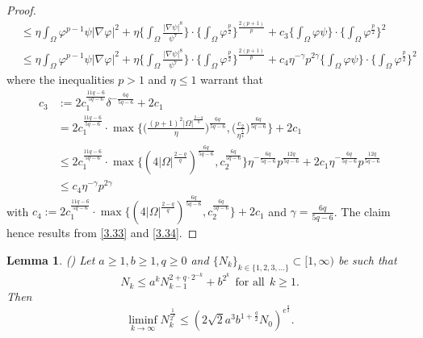 \documentclass[12pt]{article}
\theoremstyle{plain}
\newtheorem{lemma}{Lemma}[section]
\theoremstyle{definition}
\numberwithin{equation}{section}
\begin{document}
\begin{proof}
\begin{align}
            &\leq\eta\int_\Omega\varphi^{p-1}\psi|\nabla\varphi|^2
            +\eta\bigg\{\int_\Omega\frac{|\nabla\psi|^8}{\psi^7}\bigg\}
            \cdot\bigg\{\int_\Omega\varphi^{\frac{p}{2}}\bigg\}^{\frac{2(p+1)} {p}}%
            +c_3%
            \bigg\{\int_\Omega\varphi\psi\bigg\}
            \cdot\bigg\{\int_\Omega\varphi^{\frac{p}{2}}\bigg\}^{2}\nonumber\\
            &\leq\eta\int_\Omega\varphi^{p-1}\psi|\nabla\varphi|^2+\eta\bigg\{\int_\Omega\frac{|\nabla\psi|^8}{\psi^7}\bigg\}\cdot\bigg\{\int_\Omega\varphi^{\frac{p}{2}}\bigg\}^{\frac{2(p+1)} {p}}%
            +c_4\eta^{-\gamma}p^{2\gamma}\bigg\{\int_\Omega\varphi\psi\bigg\}\cdot\bigg\{\int_\Omega\varphi^{\frac{p}{2}}\bigg\}^{2}\nonumber
    \end{align}
    where the inequalities $p>1$ and $\eta\leq1$ warrant that
    \begin{align}\label{3.34}
            c_3&:=2c_1^{\frac{11q-6}{5q-6}}\delta^{-\frac{6q}{5q-6}}+2c_1\nonumber\\
            &=2c_1^{\frac{11q-6}{5q-6}}\cdot
            \max\bigg\{\bigg(\frac{(p+1)^2|\Omega|^{\frac{2-q}{q}}}{\eta}\bigg)^{\frac{6q}{5q-6}},
            \bigg(\frac{c_2}{\eta^{\frac{1}{4}}}\bigg)^{\frac{6q}{5q-6}}\bigg\}+2c_1\\
            &\leq 2c_1^{\frac{11q-6}{5q-6}}\cdot\max\bigg\{(4|\Omega|^{\frac{2-q}{q}})^{\frac{6q}{5q-6}},
            c_2^{\frac{6q}{5q-6}}\bigg\}
            \eta^{-\frac{6q}{5q-6}}p^{\frac{12q}{5q-6}}
            +2c_1\eta^{-\frac{6q}{5q-6}}p^{\frac{12q}{5q-6}}\nonumber\\
            & \leq c_4\eta^{-\gamma}p^{2\gamma}\nonumber
        \end{align}
    with $c_4:=2c_1^{\frac{11q-6}{5q-6}}\cdot\max\{(4|\Omega|^{\frac{2-q}{q}})^{\frac{6q}{5q-6}},c_2^{\frac{6q}{5q-6}}\}+2c_1$ and $\gamma=\frac{6q}{5q-6}$. The claim hence results from \eqref{3.33} and \eqref{3.34}.
\end{proof}
\begin{lemma}\label{lemma3.9}(\cite{WinklerEven})
    Let $a\geq1,b\geq1,q\geq0$ and $\{N_k\}_{k\in\{1,2,3,...\}}\subset[1,\infty)$ be such that
    \begin{equation*}
        N_{k}\leq a^k N_{k-1}^{2+q\cdot 2^{-k}}+b^{2^k}~~\mbox{for all}~~k\geq1.
    \end{equation*}
    Then
    \begin{equation}
        \liminf\limits_{k\to\infty}N_k^{\frac{1}{2^k}}\leq(2\sqrt{2}a^3b^{1+\frac{q}{2}}N_0)^{e^{\frac{q}{2}}}.
    \end{equation}
\end{lemma}
\end{document}
